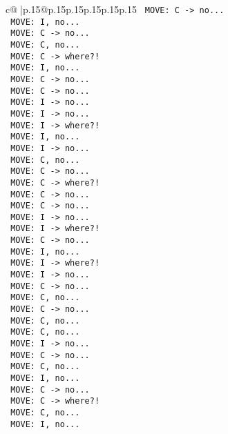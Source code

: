 \documentclass{article}
\begin{document}
{\begin{supertabular}{c@{$\;$}|p{.15\linewidth}@{}p{.15\linewidth}p{.15\linewidth}p{.15\linewidth}p{.15\linewidth}p{.15\linewidth}}
{{{\texttt{ MOVE: C {-}> no...} \\
\texttt{ MOVE: I, no...} \\
\texttt{ MOVE: C {-}> no...} \\
\texttt{ MOVE: C, no...} \\
\texttt{ MOVE: C {-}> where?!} \\
\texttt{ MOVE: I, no...} \\
\texttt{ MOVE: C {-}> no...} \\
\texttt{ MOVE: C {-}> no...} \\
\texttt{ MOVE: I {-}> no...} \\
\texttt{ MOVE: I {-}> no...} \\
\texttt{ MOVE: I {-}> where?!} \\
\texttt{ MOVE: I, no...} \\
\texttt{ MOVE: I {-}> no...} \\
\texttt{ MOVE: C, no...} \\
\texttt{ MOVE: C {-}> no...} \\
\texttt{ MOVE: C {-}> where?!} \\
\texttt{ MOVE: C {-}> no...} \\
\texttt{ MOVE: C {-}> no...} \\
\texttt{ MOVE: I {-}> no...} \\
\texttt{ MOVE: I {-}> where?!} \\
\texttt{ MOVE: C {-}> no...} \\
\texttt{ MOVE: I, no...} \\
\texttt{ MOVE: I {-}> where?!} \\
\texttt{ MOVE: I {-}> no...} \\
\texttt{ MOVE: C {-}> no...} \\
\texttt{ MOVE: C, no...} \\
\texttt{ MOVE: C {-}> no...} \\
\texttt{ MOVE: C, no...} \\
\texttt{ MOVE: C, no...} \\
\texttt{ MOVE: I {-}> no...} \\
\texttt{ MOVE: C {-}> no...} \\
\texttt{ MOVE: C, no...} \\
\texttt{ MOVE: I, no...} \\
\texttt{ MOVE: C {-}> no...} \\
\texttt{ MOVE: C {-}> where?!} \\
\texttt{ MOVE: C, no...} \\
\texttt{ MOVE: I, no...} \\
}}}
\end{supertabular}}
\end{document}
